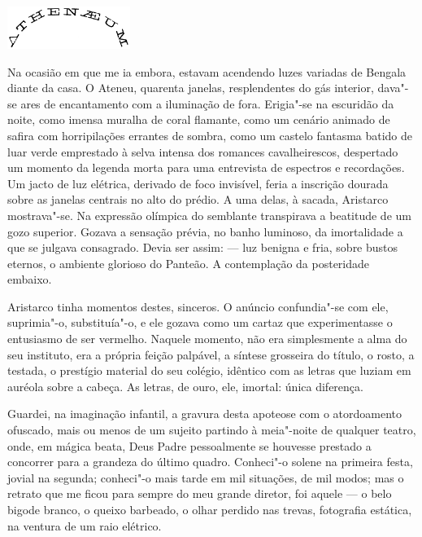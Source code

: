 \begin{center}\includegraphics[width=4cm]{3.png}\end{center}

Na ocasião em que me ia embora,
estavam acendendo luzes variadas de Bengala diante da casa. O Ateneu,
quarenta janelas, resplendentes do gás interior, dava"-se ares de
encantamento com a iluminação de fora. Erigia"-se na escuridão da
noite, como imensa muralha de coral flamante, como um cenário animado
de safira com horripilações errantes de sombra, como um castelo
fantasma batido de luar verde emprestado à selva intensa dos romances
cavalheirescos, despertado um momento da legenda morta para uma
entrevista de espectros e recordações. Um jacto de luz elétrica,
derivado de foco invisível, feria a inscrição
dourada sobre as janelas centrais no alto do prédio. A uma delas, à sacada,
Aristarco mostrava"-se. Na expressão olímpica do semblante transpirava
a beatitude de um gozo superior. Gozava a sensação prévia, no banho
luminoso, da imortalidade a que se julgava consagrado. Devia ser assim:
--- luz benigna e fria, sobre bustos eternos, o ambiente glorioso do Panteão. A
contemplação da posteridade embaixo. 

Aristarco tinha momentos destes,
sinceros. O anúncio confundia"-se com ele, suprimia"-o, substituía"-o,
e ele gozava como um cartaz que experimentasse o entusiasmo de ser
vermelho. Naquele momento, não era simplesmente a alma do seu
instituto, era a própria feição palpável, a síntese grosseira do
título, o rosto, a testada, o prestígio material do seu colégio,
idêntico com as letras que luziam em auréola sobre a cabeça. As letras,
de ouro, ele, imortal: única diferença. 


Guardei, na imaginação
infantil, a gravura desta apoteose com o atordoamento ofuscado, mais ou
menos de um sujeito partindo à meia"-noite de qualquer teatro, onde,
em mágica beata, Deus Padre pessoalmente se houvesse prestado a
concorrer para a grandeza do último quadro. Conheci"-o solene na
primeira festa, jovial na segunda; conheci"-o mais tarde em mil
situações, de mil modos; mas o retrato que me ficou para sempre do meu
grande diretor, foi aquele --- o belo bigode branco, o queixo barbeado,
o olhar perdido nas trevas, fotografia estática, na ventura de um raio
elétrico. 

